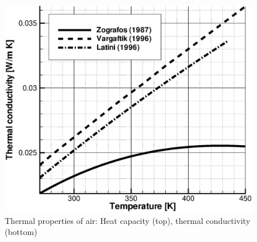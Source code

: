 \begin{figure}[htb!]
\includegraphics[scale=0.4]{H_GAS/figures/heat_conductivity_air.eps}
\caption{Thermal properties of air: Heat capacity (top), thermal conductivity (bottom)}
\label{fig:thermal_properties}
\end{figure} 

